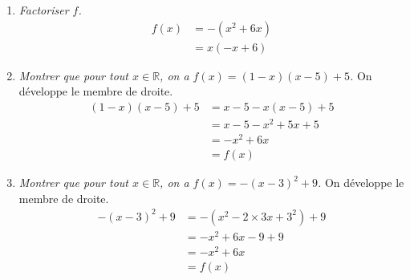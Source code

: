 \documentclass[12pt]{article}
\begin{document}
\begin{exercice}
\begin{enumerate}
            \begin{center}
          \end{center}
    \item \emph{Factoriser $f$.}
          \begin{align*}
            f\left(x\right) &= -\left(x^2+6x\right)\\
                            &= x\left(-x+6\right)
          \end{align*}
        \item \emph{Montrer que pour tout $x\in\mathbb{R}$, on a $f(x)=(1-x)(x-5)+5$.} On développe le membre de droite.
          \begin{align*}
            (1-x)(x-5)+5 &= x -5-x(x-5)+5\\
                         &= x-5-x^2+5x+5\\
                         &= -x^2+6x\\
                         &= f(x)
          \end{align*}
        \item \emph{Montrer que pour tout $x\in\mathbb{R}$, on a $f(x)=-(x-3)^2+9$.} On développe le membre de droite.
          \begin{align*}
            -(x-3)^2+9 &= -\left(x^2-2\times3x+3^2\right)+9\\
                       &= -x^2+6x-9+9\\
                       &= -x^2+6x\\
                       &= f(x)

\end{align*}
\end{enumerate}
\end{exercice}
\end{document}
